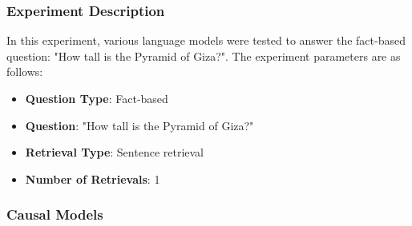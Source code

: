 \documentclass{wseas}
\begin{document}
\subsubsection{Experiment Description}
In this experiment, various language models were tested to answer the
fact-based question: "How tall is the Pyramid of Giza?". The
experiment parameters are as follows:

\begin{itemize}
\item
  \textbf{Question Type}: Fact-based
\item
  \textbf{Question}: "How tall is the Pyramid of Giza?"
\item
  \textbf{Retrieval Type}: Sentence retrieval
\item
  \textbf{Number of Retrievals}: 1
\end{itemize}

\subsubsection{Causal Models}
\end{document}
